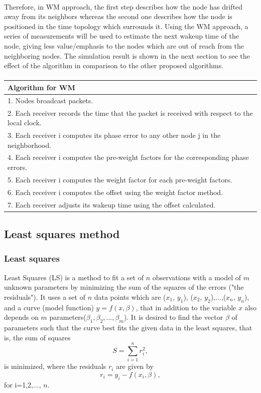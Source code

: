 \documentclass[a4paper,10pt]{report}
\begin{document}
\paragraph*{}
Therefore, in WM approach, the first step describes how the node has
drifted away from its neighbors whereas the second one describes how
the node is positioned in the time topology which surrounds it.
Using the WM approach, a series of measurements will be used to
estimate the next wakeup time of the node, giving less
value/emphasis to the nodes which are out of reach from the
neighboring nodes. The simulation result is shown in the next
section to see the effect of the algorithm in comparison to the
other proposed algorithms.\paragraph*{}
\begin{tabular}{  l }Algorithm for WM \\\hline \hline
1. Nodes broadcast packets. \\  2. Each receiver records the time that the packet is received with respect to the local clock. \\
3. Each receiver i computes its phase error to any other node j in the neighborhood. \\
4. Each receiver i computes the pre-weight factors for the corresponding phase errors. \\
5. Each receiver i computes the weight factor for each pre-weight factors. \\
6. Each receiver i computes the offset using the weight factor method. \\
7. Each receiver adjusts its wakeup time using the offset calculated.\\
\hline \hline
\end{tabular}
\subsection{\textbf{Least squares method}}
\subsubsection{Least squares}
Least Squares (LS) is a method to fit a set of $n$ observations with
a model of $m$ unknown parameters by minimizing the sum of the
squares of the errors ("the residuals"). It uses a set of $n$ data
points which are ($x_1$, $y_1$), ($x_2$, $y_2$),$\dots$,($x_n$,
$y_n$), and a curve (model function) $y= f(x, \beta)$, that in
addition to the variable $x$ also depends on $m$
parameters($\beta_1,\beta_2,...,\beta_m$). It is desired to find the
vector $\beta$ of parameters such that the curve best fits the given
data in the least squares, that is, the sum of squares
\begin{equation}
    S=\sum_{i=1}^{n}r_i^2 ,
\end{equation}
is minimized, where the residuals $r_i$ are given by
\begin{equation}
    r_i = y_i - f(x_i,\beta),
\end{equation}
for i=1,2,$\dots$, $n$.
\end{document}
